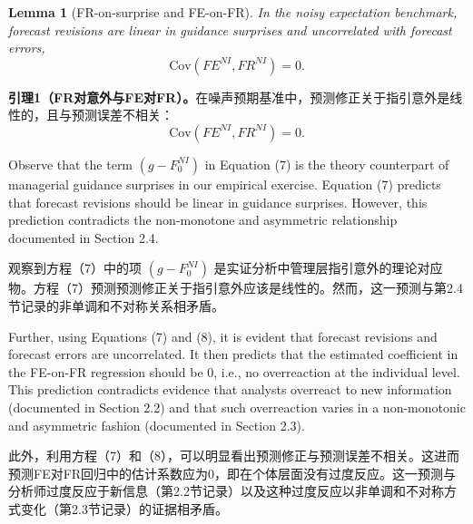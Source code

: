 \documentclass[12pt,a4paper]{article}
\newenvironment{original}
  {\par\medskip\noindent\ignorespaces}
  {\par\medskip}
\newenvironment{translation}
  {\par\noindent{\color{transblue}\ignorespaces}}
  {\par\bigskip}
\newtheorem{lemma}[theorem]{Lemma}
\begin{document}
\begin{lemma}[FR-on-surprise and FE-on-FR]
In the noisy expectation benchmark, forecast revisions are linear in guidance surprises and uncorrelated with forecast errors,
\[
\text{Cov}(FE^{NI}, FR^{NI}) = 0.
\]
\end{lemma}
\begin{translation}
\textbf{引理1（FR对意外与FE对FR）。}在噪声预期基准中，预测修正关于指引意外是线性的，且与预测误差不相关：
\[
\text{Cov}(FE^{NI}, FR^{NI}) = 0.
\]
\end{translation}

\begin{original}
Observe that the term $(g - F_0^{NI})$ in Equation (7) is the theory counterpart of managerial guidance surprises in our empirical exercise. Equation (7) predicts that forecast revisions should be linear in guidance surprises. However, this prediction contradicts the non-monotone and asymmetric relationship documented in Section 2.4.
\end{original}
\begin{translation}
观察到方程（7）中的项 $(g - F_0^{NI})$ 是实证分析中管理层指引意外的理论对应物。方程（7）预测预测修正关于指引意外应该是线性的。然而，这一预测与第2.4节记录的非单调和不对称关系相矛盾。
\end{translation}

\begin{original}
Further, using Equations (7) and (8), it is evident that forecast revisions and forecast errors are uncorrelated. It then predicts that the estimated coefficient in the FE-on-FR regression should be 0, i.e., no overreaction at the individual level. This prediction contradicts evidence that analysts overreact to new information (documented in Section 2.2) and that such overreaction varies in a non-monotonic and asymmetric fashion (documented in Section 2.3).
\end{original}
\begin{translation}
此外，利用方程（7）和（8），可以明显看出预测修正与预测误差不相关。这进而预测FE对FR回归中的估计系数应为0，即在个体层面没有过度反应。这一预测与分析师过度反应于新信息（第2.2节记录）以及这种过度反应以非单调和不对称方式变化（第2.3节记录）的证据相矛盾。
\end{translation}
\end{document}
